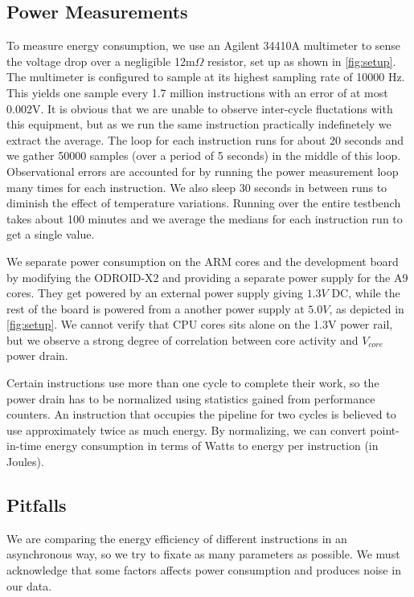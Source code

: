 \subsection{Power Measurements}
To measure energy consumption, we use an Agilent 34410A
multimeter\cite{agilent34410a} to sense the voltage drop over a negligible
12m$\Omega$ resistor, set up as shown in \autoref{fig:setup}. The multimeter is
configured to sample at its highest sampling rate of 10000 Hz. This yields one
sample every 1.7 million instructions with an error of at most
0.002V. It is obvious that we are unable to observe inter-cycle
fluctations with this equipment, but as we run the same instruction practically
indefinetely we extract the average. The loop for each instruction runs for
about 20 seconds and we gather 50000 samples (over a period of 5 seconds) in the
middle of this loop. Observational errors are accounted for by running the power
measurement loop many times for each instruction. We also sleep 30 seconds in
between runs to diminish the effect of temperature variations. Running over the
entire testbench takes about 100 minutes and we average the medians for each
instruction run to get a single value.

We separate power consumption on the ARM cores and the development board by
modifying the ODROID-X2 and providing a separate power supply for the A9 cores.
They get powered by an external power supply giving $1.3V$ DC, while the rest of
the board is powered from a another power supply at $5.0V$, as depicted in
\autoref{fig:setup}. We cannot verify that CPU cores sits alone on the 1.3V
power rail, but we observe a strong degree of correlation between core activity
and $V_{core}$ power drain.

Certain instructions use more than one cycle to complete their work, so the
power drain has to be normalized using statistics gained from performance
counters. An instruction that occupies the pipeline for two cycles is believed
to use approximately twice as much energy. By normalizing, we can convert
point-in-time energy consumption in terms of Watts to energy per instruction (in
Joules).


\subsection{Pitfalls}
We are comparing the energy efficiency of different instructions in an
asynchronous way, so we try to fixate as many parameters as possible. We must
acknowledge that some factors affects power consumption and produces noise in
our data.

